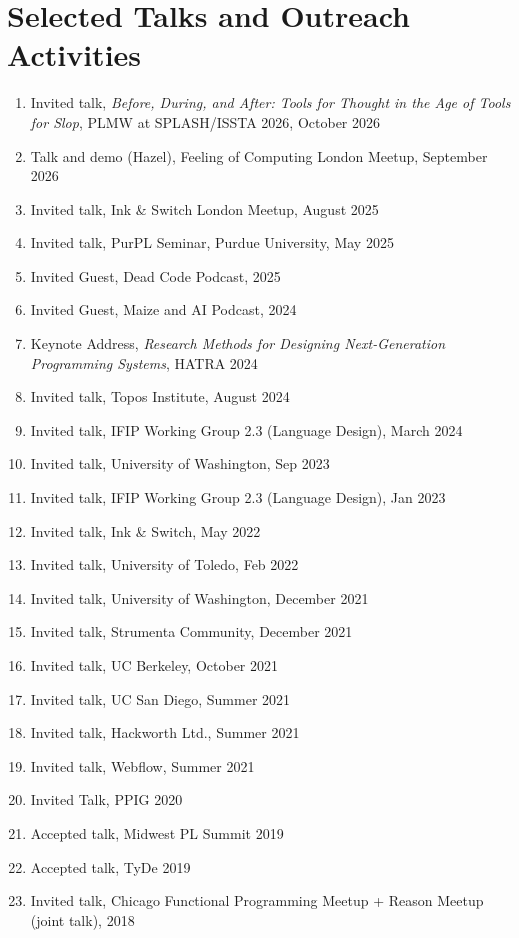 \documentclass[10pt,letterpaper]{article}
\begin{document}
\section*{Selected Talks and Outreach Activities}
\begin{enumerate}
  \item Invited talk, \textit{Before, During, and After: Tools for Thought in the Age of Tools for Slop}, PLMW at SPLASH/ISSTA 2026, October 2026
  \item Talk and demo (Hazel), Feeling of Computing London Meetup, September 2026
  \item Invited talk, Ink \& Switch London Meetup, August 2025
  \item Invited talk, PurPL Seminar, Purdue University, May 2025
  \item Invited Guest, Dead Code Podcast, 2025
  \item Invited Guest, Maize and AI Podcast, 2024
  \item Keynote Address, \textit{Research Methods for Designing Next-Generation Programming Systems}, HATRA 2024
  \item Invited talk, Topos Institute, August 2024
  \item Invited talk, IFIP Working Group 2.3 (Language Design), March 2024
  \item Invited talk, University of Washington, Sep 2023
  \item Invited talk, IFIP Working Group 2.3 (Language Design), Jan 2023
  \item Invited talk, Ink \& Switch, May 2022
  \item Invited talk, University of Toledo, Feb 2022
  \item Invited talk, University of Washington, December 2021
  \item Invited talk, Strumenta Community, December 2021
  \item Invited talk, UC Berkeley, October 2021
  \item Invited talk, UC San Diego, Summer 2021
  \item Invited talk, Hackworth Ltd., Summer 2021
  \item Invited talk, Webflow, Summer 2021
  \item Invited Talk, PPIG 2020
  \item Accepted talk, Midwest PL Summit 2019
  \item Accepted talk, TyDe 2019
  \item Invited talk, Chicago Functional Programming Meetup + Reason Meetup (joint talk), 2018

\end{enumerate}
\end{document}
